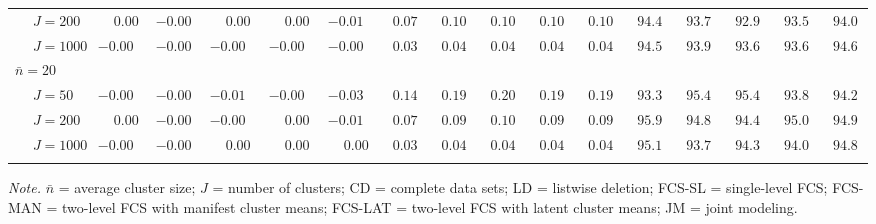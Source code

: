 \begin{sidewaystable}
\begin{threeparttable}
\begin{tabular}{llccccccccccccccc}
 & \nopagebreak $\;J=200$  & $\phantom{-}0.00\phantom{0}$ & ${-}0.00\phantom{0}$ & $\phantom{-}0.00\phantom{0}$ & $\phantom{-}0.00\phantom{0}$ & ${-}0.01\phantom{0}$ & $\phantom{0}0.07\phantom{0}$ & $\phantom{0}0.10\phantom{0}$ & $\phantom{0}0.10\phantom{0}$ & $\phantom{0}0.10\phantom{0}$ & $\phantom{0}0.10\phantom{0}$ & $\phantom{0}94.4\phantom{0}$ & $\phantom{0}93.7\phantom{0}$ & $\phantom{0}92.9\phantom{0}$ & $\phantom{0}93.5\phantom{0}$ & $\phantom{0}94.0\phantom{0}$ \\
 & \nopagebreak $\;J=1000$  & ${-}0.00\phantom{0}$ & ${-}0.00\phantom{0}$ & ${-}0.00\phantom{0}$ & ${-}0.00\phantom{0}$ & ${-}0.00\phantom{0}$ & $\phantom{0}0.03\phantom{0}$ & $\phantom{0}0.04\phantom{0}$ & $\phantom{0}0.04\phantom{0}$ & $\phantom{0}0.04\phantom{0}$ & $\phantom{0}0.04\phantom{0}$ & $\phantom{0}94.5\phantom{0}$ & $\phantom{0}93.9\phantom{0}$ & $\phantom{0}93.6\phantom{0}$ & $\phantom{0}93.6\phantom{0}$ & $\phantom{0}94.6\phantom{0}$ \\
\multicolumn{4}{l}{$\bar{n}=20$} \\  & \nopagebreak $\;J=50$  & ${-}0.00\phantom{0}$ & ${-}0.00\phantom{0}$ & ${-}0.01\phantom{0}$ & ${-}0.00\phantom{0}$ & ${-}0.03\phantom{0}$ & $\phantom{0}0.14\phantom{0}$ & $\phantom{0}0.19\phantom{0}$ & $\phantom{0}0.20\phantom{0}$ & $\phantom{0}0.19\phantom{0}$ & $\phantom{0}0.19\phantom{0}$ & $\phantom{0}93.3\phantom{0}$ & $\phantom{0}95.4\phantom{0}$ & $\phantom{0}95.4\phantom{0}$ & $\phantom{0}93.8\phantom{0}$ & $\phantom{0}94.2\phantom{0}$ \\
 & \nopagebreak $\;J=200$  & $\phantom{-}0.00\phantom{0}$ & ${-}0.00\phantom{0}$ & ${-}0.00\phantom{0}$ & $\phantom{-}0.00\phantom{0}$ & ${-}0.01\phantom{0}$ & $\phantom{0}0.07\phantom{0}$ & $\phantom{0}0.09\phantom{0}$ & $\phantom{0}0.10\phantom{0}$ & $\phantom{0}0.09\phantom{0}$ & $\phantom{0}0.09\phantom{0}$ & $\phantom{0}95.9\phantom{0}$ & $\phantom{0}94.8\phantom{0}$ & $\phantom{0}94.4\phantom{0}$ & $\phantom{0}95.0\phantom{0}$ & $\phantom{0}94.9\phantom{0}$ \\
 & \nopagebreak $\;J=1000$  & ${-}0.00\phantom{0}$ & ${-}0.00\phantom{0}$ & $\phantom{-}0.00\phantom{0}$ & $\phantom{-}0.00\phantom{0}$ & $\phantom{-}0.00\phantom{0}$ & $\phantom{0}0.03\phantom{0}$ & $\phantom{0}0.04\phantom{0}$ & $\phantom{0}0.04\phantom{0}$ & $\phantom{0}0.04\phantom{0}$ & $\phantom{0}0.04\phantom{0}$ & $\phantom{0}95.1\phantom{0}$ & $\phantom{0}93.7\phantom{0}$ & $\phantom{0}94.3\phantom{0}$ & $\phantom{0}94.0\phantom{0}$ & $\phantom{0}94.8\phantom{0}$ \\
[0.5ex]\hline\\[-1.6ex] 
\end{tabular}
\begin{tablenotes}{\footnotesize \textit{Note.} $\bar{n}$ = average cluster size; $J$ = number of clusters; CD = complete data sets; LD = listwise deletion; FCS-SL = single-level FCS; FCS-MAN = two-level FCS with manifest cluster means; FCS-LAT = two-level FCS with latent cluster means; JM = joint modeling.}\end{tablenotes}
\end{threeparttable}
\end{sidewaystable}
